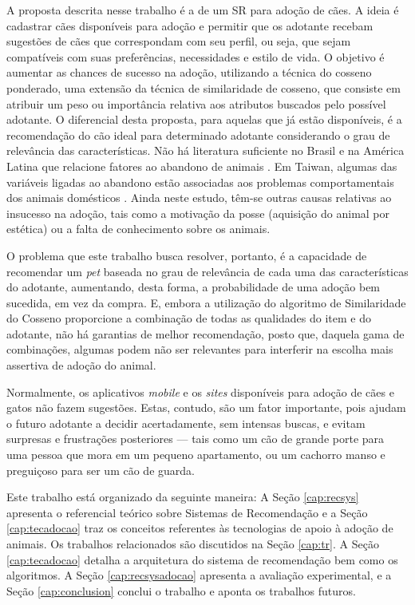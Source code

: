 \documentclass[portuguese]{textolivre}
\begin{document}
A proposta descrita nesse trabalho é a de um SR para adoção de cães. A ideia é cadastrar cães disponíveis para adoção e permitir que os adotante  recebam sugestões de cães que correspondam com seu perfil, ou seja, que sejam compatíveis com suas preferências, necessidades e estilo de vida. O objetivo é aumentar as chances de sucesso na adoção, utilizando a técnica do cosseno ponderado, uma extensão da técnica de similaridade de cosseno, que consiste em atribuir um peso ou importância relativa aos atributos buscados pelo possível adotante. O diferencial desta proposta, para aquelas que já estão disponíveis, é a recomendação do cão ideal para determinado adotante considerando o grau de relevância das características. Não há literatura suficiente no Brasil e na América Latina que relacione fatores ao abandono de animais \cite{RECMVZ16221}. Em Taiwan, algumas das variáveis ligadas ao abandono estão associadas aos problemas comportamentais dos animais domésticos 
\cite{Weng:2006}. Ainda neste estudo, têm-se outras causas relativas ao insucesso na adoção, tais como a motivação da posse (aquisição do animal por estética) ou a falta de conhecimento sobre os animais.

O problema que este trabalho busca resolver, portanto, é a capacidade de recomendar um \textit{pet} baseada no grau de relevância de cada uma das características do adotante, aumentando, desta forma, a probabilidade de uma adoção bem sucedida, em vez da compra. E, embora a utilização do algoritmo de Similaridade do Cosseno proporcione a combinação de todas as qualidades do item e do adotante, não há garantias de melhor recomendação, posto que, daquela gama de combinações, algumas podem não ser relevantes para interferir na escolha mais assertiva de adoção do animal. 

Normalmente, os aplicativos \textit{mobile} e os \textit{sites} disponíveis para adoção de cães e gatos não fazem sugestões. Estas, contudo, são um fator importante, pois ajudam o futuro adotante a decidir acertadamente, sem intensas buscas, e evitam surpresas e frustrações posteriores — tais como um cão de grande porte para uma pessoa que mora em um pequeno apartamento, ou um cachorro manso e preguiçoso para ser um cão de guarda.

Este trabalho está organizado da seguinte maneira: A Seção \ref{cap:recsys} apresenta o referencial teórico sobre Sistemas de Recomendação e a Seção \ref{cap:tecadocao} traz os conceitos referentes às tecnologias de apoio à adoção de animais. Os trabalhos relacionados são discutidos na Seção \ref{cap:tr}. A Seção \ref{cap:tecadocao} detalha a arquitetura do sistema de recomendação bem como os algoritmos. A Seção \ref{cap:recsysadocao} apresenta a avaliação experimental, e a Seção \ref{cap:conclusion} conclui o trabalho e aponta os trabalhos futuros.
\end{document}
